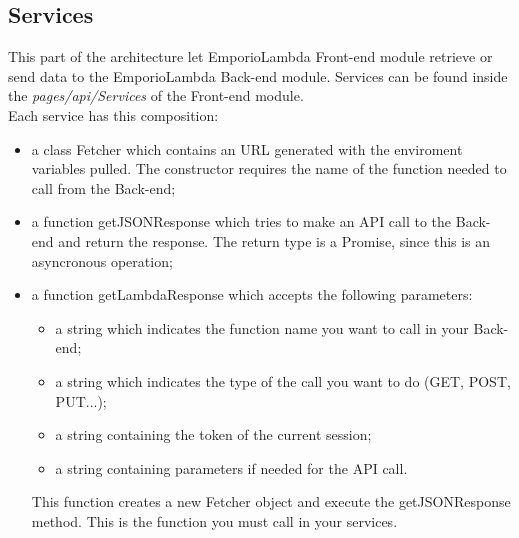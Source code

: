 \subsection{Services}
This part of the architecture let EmporioLambda Front-end module retrieve or send data to the EmporioLambda Back-end module. Services can be found inside the \textit{pages/api/Services} of the Front-end module.\\
Each service has this composition:
\begin{itemize}
\item a class Fetcher which contains an URL generated with the enviroment variables pulled. The constructor requires the name of the function needed to call from the Back-end;
\item a function getJSONResponse which tries to make an API call to the Back-end and return the response. The return type is a Promise, since this is an asyncronous operation;
\item a function getLambdaResponse which accepts the following parameters:\begin{itemize}
\item a string which indicates the function name you want to call in your Back-end; 
\item a string which indicates the type of the call you want to do (GET, POST, PUT...);
\item a string containing the token of the current session; 
\item a string containing parameters if needed for the API call. 
\end{itemize} 
This function creates a new Fetcher object and execute the getJSONResponse method. This is the function you must call in your services.
\end{itemize}
